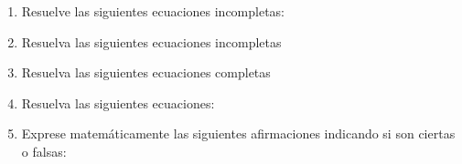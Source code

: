 \documentclass[letterpaper,11pt,twoside]{article}
\begin{document}
\begin{enumerate}
 \item Resuelve las siguientes ecuaciones incompletas:
 \begin{enumerate}
 \end{enumerate}
 \item Resuelva las siguientes ecuaciones incompletas
 \begin{enumerate}
 \end{enumerate}
 \item Resuelva las siguientes ecuaciones completas
 \begin{enumerate}
 \end{enumerate}
 \item Resuelva las siguientes ecuaciones:
 \begin{enumerate}
 \end{enumerate}
 \item Exprese matemáticamente las siguientes afirmaciones indicando si son ciertas o falsas:

\end{enumerate}
\end{document}
